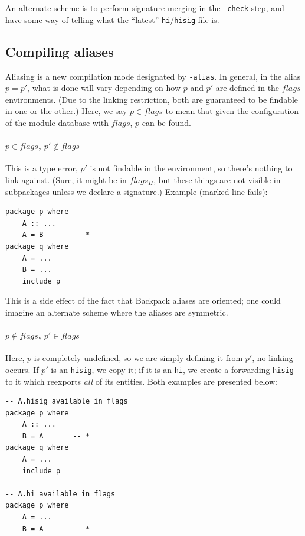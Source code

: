 \documentclass{article}
\begin{document}
An alternate scheme is to perform signature merging in the \verb|-check| step,
and have some way of telling what the ``latest'' \verb|hi|/\verb|hisig| file is.

\subsection{Compiling aliases}

Aliasing is a new compilation mode designated by \verb|-alias|.  In
general, in the alias $p = p'$, what is done will vary depending on how
$p$ and $p'$ are defined in the $flags$ environments.
(Due to the linking restriction, both are guaranteed to be findable in
one or the other.)  Here, we say $p\in flags$ to mean that given the
configuration of the module database with $flags$, $p$ can be found.

\paragraph{$p\in flags$, $p'\not\in flags$ }  This is a type error, $p'$ is
not findable in the environment, so there's nothing to link against. (Sure,
it might be in $flags_H$, but these things are not visible in subpackages
unless we declare a signature.)  Example (marked line fails):

\begin{verbatim}
package p where
    A :: ...
    A = B       -- *
package q where
    A = ...
    B = ...
    include p
\end{verbatim}

This is a side effect of the fact that Backpack aliases are oriented;
one could imagine an alternate scheme where the aliases are symmetric.

\paragraph{$p\not\in flags$, $p'\in flags$ }  Here,
$p$ is completely undefined, so we are simply defining it from $p'$, no
linking occurs.  If $p'$ is an \texttt{hisig}, we copy it; if it is an \texttt{hi},
we create a forwarding \texttt{hisig} to it which reexports \emph{all} of
its entities.  Both examples are presented below:

\begin{verbatim}
-- A.hisig available in flags
package p where
    A :: ...
    B = A       -- *
package q where
    A = ...
    include p

-- A.hi available in flags
package p where
    A = ...
    B = A       -- *
\end{verbatim}
\end{document}
